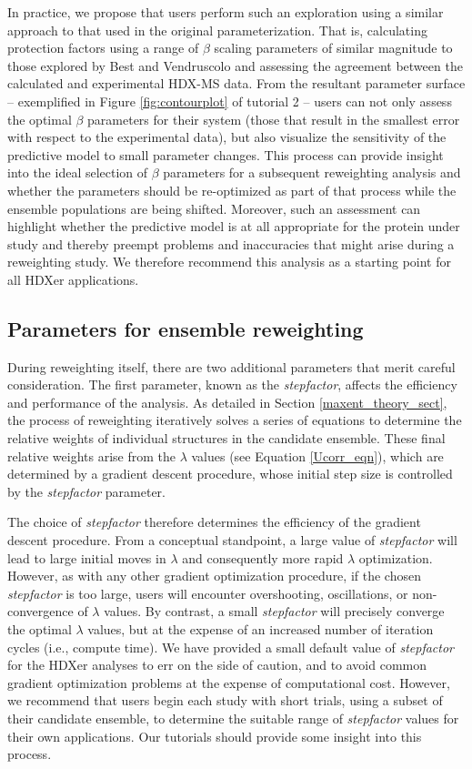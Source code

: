 \documentclass[9pt,tutorial,ASAPversion]{livecoms}
\begin{document}
In practice, we propose that users perform such an exploration using a similar approach to that used in the original parameterization.
That is, calculating protection factors using a range of $\beta$ scaling parameters of similar magnitude to those explored by Best and Vendruscolo and assessing the agreement between the calculated and experimental HDX-MS data.
From the resultant parameter surface -- exemplified in Figure \ref{fig:contourplot} of tutorial 2 -- users can not only assess the optimal $\beta$ parameters for their system (those that result in the smallest error with respect to the experimental data), but also visualize the sensitivity of the predictive model to small parameter changes.
This process can provide insight into the ideal selection of $\beta$ parameters for a subsequent reweighting analysis and whether the parameters should be re-optimized as part of that process while the ensemble populations are being shifted.
Moreover, such an assessment can highlight whether the predictive model is at all appropriate for the protein under study and thereby preempt problems and inaccuracies that might arise during a reweighting study.
We therefore recommend this analysis as a starting point for all HDXer applications.

\subsection{Parameters for ensemble reweighting}
During reweighting itself, there are two additional parameters that merit careful consideration.
The first parameter, known as the \textit{stepfactor}, affects the efficiency and performance of the analysis. 
As detailed in Section \ref{maxent_theory_sect}, the process of reweighting iteratively solves a series of equations to determine the relative weights of individual structures in the candidate ensemble.
These final relative weights arise from the $\lambda$ values (see Equation \ref{Ucorr_eqn}), which are determined by a gradient descent procedure, whose initial step size is controlled by the \textit{stepfactor} parameter.

The choice of \textit{stepfactor} therefore determines the efficiency of the gradient descent procedure. 
From a conceptual standpoint, a large value of \textit{stepfactor} will lead to large initial moves in $\lambda$ and consequently more rapid $\lambda$ optimization.
However, as with any other gradient optimization procedure, if the chosen \textit{stepfactor} is too large, users will encounter overshooting, oscillations, or non-convergence of $\lambda$ values.
By contrast, a small \textit{stepfactor} will precisely converge the optimal $\lambda$ values, but at the expense of an increased number of iteration cycles (i.e., compute time).
We have provided a small default value of \textit{stepfactor} for the HDXer analyses to err on the side of caution, and to avoid common gradient optimization problems at the expense of computational cost.
However, we recommend that users begin each study with short trials, using a subset of their candidate ensemble, to determine the suitable range of \textit{stepfactor} values for their own applications.
Our tutorials should provide some insight into this process.
\end{document}
